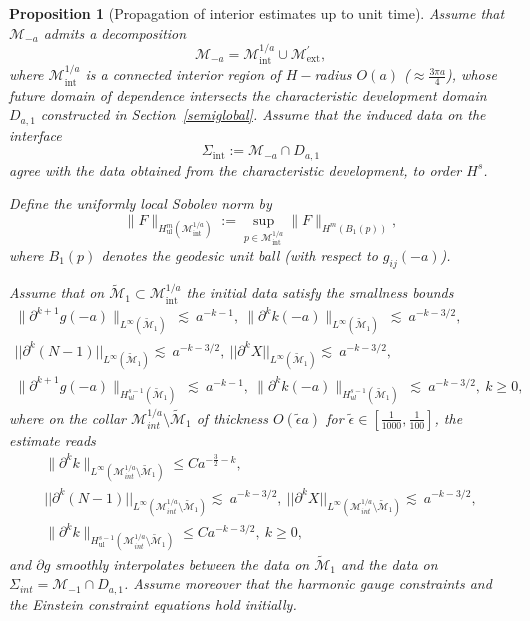 \documentclass{amsart}
\newtheorem{proposition}{Proposition}[section]
\begin{document}
{\begin{proposition}[Propagation of interior estimates up to unit time]
\noindent Assume that $\mathcal{M}_{-a}$ admits a decomposition
\[
\mathcal{M}_{-a}=\mathcal{M}^{1/a}_{\mathrm{int}}\cup \mathcal{M}^{'}_{\mathrm{ext}},
\]
where $\mathcal{M}^{1/a}_{\mathrm{int}}$ is a connected interior region of $H-$radius $O(a)$ ($\approx \frac{3\pi a}{4}$), whose future domain of
dependence intersects the characteristic development domain $D_{a,1}$ constructed in
Section~\ref{semiglobal}. Assume that the induced data on the interface
\[
\Sigma_{\mathrm{int}}:=\mathcal{M}_{-a}\cap D_{a,1}
\]
agree with the data obtained from the characteristic development, to order $H^{s}$.

\medskip

\noindent Define the uniformly local Sobolev norm by
\[
\|F\|_{H^{m}_{\mathrm{ul}}(\mathcal{M}^{1/a}_{\mathrm{int}})}
:=
\sup_{p\in \mathcal{M}^{1/a}_{\mathrm{int}}}
\|F\|_{H^{m}(B_{1}(p))},
\]
where $B_{1}(p)$ denotes the geodesic unit ball (with respect to $g_{ij}(-a)$).

\medskip
\noindent
Assume that on $\widetilde{\mathcal{M}}_{1}\subset \mathcal{M}^{1/a}_{\mathrm{int}}$ the initial data satisfy the smallness bounds
\begin{align}
 \|\partial^{k+1} g(-a)\|_{L^\infty(\widetilde{\mathcal{M}}_{1})}\ \lesssim\ a^{-k-1},~
\|\partial^{k}k(-a)\|_{L^\infty(\widetilde{\mathcal{M}}_{1})}\ \lesssim\ a^{-k-3/2},\\\nonumber
||\partial^{k}(N-1)||_{L^{\infty}(\widetilde{\mathcal{M}}_{1})} \lesssim\ a^{-k-3/2},~ ||\partial^{k}X||_{L^{\infty}(\widetilde{\mathcal{M}}_{1})} \lesssim\ a^{-k-3/2},\\
\|\partial^{k+1} g(-a)\|_{H^{s-1}_{ul}(\widetilde{\mathcal{M}}_{1})}\ \lesssim\ a^{-k-1},~
\|\partial^{k}k(-a)\|_{H^{s-1}_{ul}(\widetilde{\mathcal{M}}_{1})}\ \lesssim\ a^{-k-3/2},~k\geq 0,
\end{align}
where on the collar $\mathcal{M}^{1/a}_{int}\setminus \widetilde{\mathcal{M}}_{1}$ of thickness $O(\widetilde{\epsilon} a)$ for $\widetilde{\epsilon}\in [\frac{1}{1000},\frac{1}{100}]$, the estimate reads 
\begin{align}
\label{eq:k1}
\|\partial^{k}k\|_{L^\infty(\mathcal{M}^{1/a}_{int}\setminus \widetilde{\mathcal{M}}_{1})}
\le C a^{-\frac{3}{2}-k},\\
||\partial^{k}(N-1)||_{L^{\infty}(\mathcal{M}^{1/a}_{int}\setminus \widetilde{\mathcal{M}}_{1})} \lesssim\ a^{-k-3/2},~ ||\partial^{k}X||_{L^{\infty}(\mathcal{M}^{1/a}_{int}\setminus \widetilde{\mathcal{M}}_{1})} \lesssim\ a^{-k-3/2},\\
\label{eq:k2}
\|\partial^{k}k\|_{H^{s-1}_{\mathrm{ul}}(\mathcal{M}^{1/a}_{int}\setminus \widetilde{\mathcal{M}}_{1})}
\le C a^{-k-3/2},~k\geq 0,
\end{align}
and $\partial g$ smoothly interpolates between the data on $\widetilde{\mathcal{M}}_{1}$ and the data on $\Sigma_{int}=\mathcal{M}_{-1}\cap D_{a,1}$.
Assume moreover that the harmonic gauge constraints and the Einstein constraint equations hold initially.


\end{proposition}}
\end{document}
